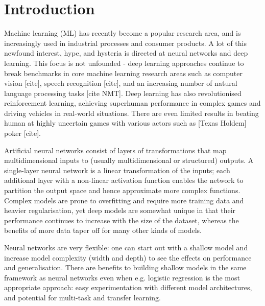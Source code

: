 \chapter{Introduction}


Machine learning (ML) has recently become a popular research area, and is increasingly used in industrial processes and consumer products.
A lot of this newfound interest, hype, and hysteria is directed at  neural networks and deep learning.
This focus is not unfounded - deep learning approaches continue to break benchmarks in  core machine learning research areas such as computer vision [cite], speech recognition [cite], and an increasing number of natural language processing tasks [cite NMT].
Deep learning has also revolutionised reinforcement learning, achieving superhuman performance in complex games and driving vehicles in real-world situations.
There are even limited results in  beating human at highly uncertain games with various actors such as [Texas Holdem] poker [cite].

Artificial neural networks consist of layers of transformations that map multidimensional inputs to (usually multidimensional or structured) outputs.
A single-layer neural network is a linear transformation of the inputs; each additional layer with a non-linear activation function enables the network to partition the output space and hence approximate more complex functions.
Complex models are prone to overfitting and require more training data and heavier regularisation, yet deep models are somewhat unique in that their performance continues to increase with the size of the dataset, whereas the benefits of more data taper off for many other kinds of models.

Neural networks are very flexible: one can start out with a shallow model and increase model complexity (width and depth) to see the effects on performance and generalisation.
There are benefits to building shallow models in the same framework as neural networks even when e.g. logistic regression is the most appropriate approach: easy experimentation with different model architectures, and potential for multi-task and transfer learning.

